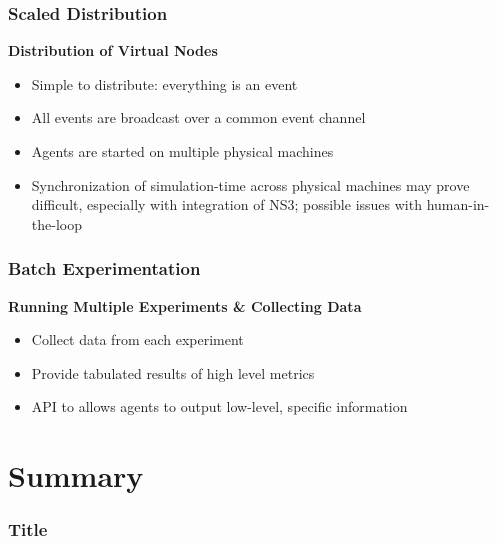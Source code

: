 \documentclass[mathserif]{beamer}
\begin{document}
\frame
{
    \frametitle{Scaled Distribution}
    \textbf{Distribution of Virtual Nodes}
    \begin{itemize}
        \item Simple to distribute: everything is an event
        \item All events are broadcast over a common event channel
        \item Agents are started on multiple physical machines
        \item Synchronization of simulation-time across physical machines may prove difficult, especially with integration of NS3; possible issues with human-in-the-loop
    \end{itemize}
}

\frame
{
    \frametitle{Batch Experimentation}
    \textbf{Running Multiple Experiments \& Collecting Data}
    \begin{itemize}
        \item Collect data from each experiment
        \item Provide tabulated results of high level metrics
        \item API to allows agents to output low-level, specific information
    \end{itemize}
}

\section{Summary}

\frame
{
    \frametitle{Title}
}
\end{document}
